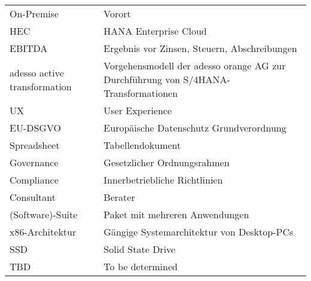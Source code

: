 \begin{xltabular}{\textwidth}{p{0.4\textwidth}p{0.6\textwidth}}
    On-Premise & Vorort\\
    HEC & HANA Enterprise Cloud\\
    EBITDA & Ergebnis vor Zinsen, Steuern, Abschreibungen\\
    adesso active transformation & Vorgehensmodell der adesso orange AG zur Durchführung von S/4HANA-Transformationen\\
    UX & User Experience\\
    EU-DSGVO & Europäische Datenschutz Grundverordnung\\
    Spreadsheet & Tabellendokument\\
    Governance & Gesetzlicher Ordnungsrahmen\\
    Compliance & Innerbetriebliche Richtlinien\\
    Consultant & Berater\\
    (Software)-Suite & Paket mit mehreren Anwendungen\\
    x86-Architektur & Gängige Systemarchitektur von Desktop-PCs\\
    SSD & Solid State Drive\\
    TBD & To be determined
\end{xltabular}
\newpage

\listoffigures{}
\listoftables{}

\newpage

